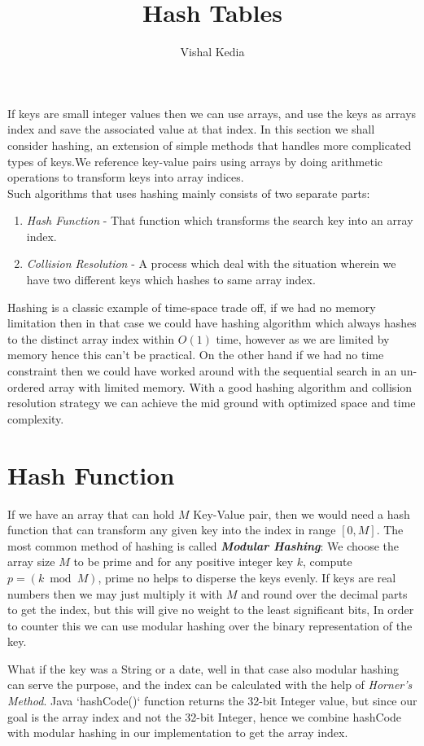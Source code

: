\documentclass[10pt,a4paper,draft]{article}
\author{Vishal Kedia}
\title{Hash Tables}
\begin{document}
\maketitle

If keys are small integer values then we can use arrays, and use the keys as arrays index and save the associated value at that index. In this section we shall consider hashing, an extension of simple methods that handles more complicated types of keys.We reference key-value pairs using arrays by doing arithmetic operations to transform keys into array indices.
\\
Such algorithms that uses hashing mainly consists of two separate parts:
\begin{enumerate}
\item \emph{Hash Function} - That function which transforms the search key into an array index.
\item \emph{Collision Resolution} - A process which deal with the situation wherein we have two different keys which hashes to same array index.
\end{enumerate}
\par Hashing is a classic example of time-space trade off, if we had no memory limitation then in that case we could have hashing algorithm which always hashes to the distinct array index within $O(1)$ time, however as we are limited by memory hence this can't be practical. On the other hand if we had no time constraint then we could have worked around with the sequential search in an un-ordered array with limited memory. With a good hashing algorithm and collision resolution strategy we can achieve the mid ground with optimized space and time complexity.
\section{Hash Function}
If we have an array that can hold $M$ Key-Value pair, then we would need a hash function that can transform any given key into the index in range $[0,M]$. The most common method of hashing is called \textbf{\emph{Modular Hashing}}: We choose the array size $M$ to be prime and for any positive integer key $k$, compute $p = ( k \bmod{M})$, prime no helps to disperse the keys evenly. If keys are real numbers then we may just multiply it with $M$ and round over the decimal parts to get the index, but this will give no weight to the least significant bits, In order to counter this we can use modular hashing over the binary representation of the key.
\par What if the key was a String or a date, well in that case also modular hashing can serve the purpose, and the index can be calculated with the help of \emph{Horner's Method}. Java `hashCode()` function returns the 32-bit Integer value, but since our goal is the array index and not the 32-bit Integer, hence we combine hashCode with modular hashing in our implementation to get the array index. 
\end{document}
